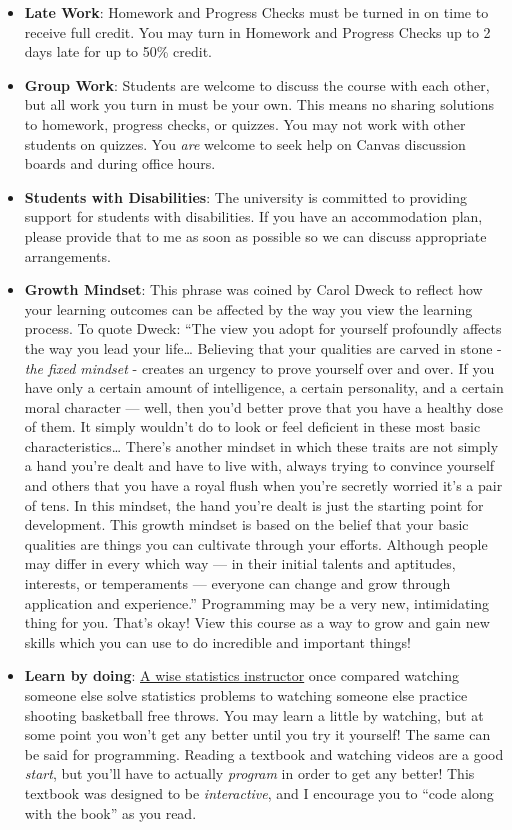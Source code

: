 \documentclass[
]{article}
\providecommand{\tightlist}{%
  \setlength{\itemsep}{0pt}\setlength{\parskip}{0pt}}
\begin{document}
\begin{itemize}
\tightlist
\item
  \textbf{Late Work}: Homework and Progress Checks must be turned in on time to receive full credit. You may turn in Homework and Progress Checks up to 2 days late for up to 50\% credit.
\item
  \textbf{Group Work}: Students are welcome to discuss the course with each other, but all work you turn in must be your own. This means no sharing solutions to homework, progress checks, or quizzes. You may not work with other students on quizzes. You \emph{are} welcome to seek help on Canvas discussion boards and during office hours.
\item
  \textbf{Students with Disabilities}: The university is committed to providing support for students with disabilities. If you have an accommodation plan, please provide that to me as soon as possible so we can discuss appropriate arrangements.
\item
  \textbf{Growth Mindset}: This phrase was coined by Carol Dweck to reflect how your learning outcomes can be affected by the way you view the learning process. To quote Dweck: ``The view you adopt for yourself profoundly affects the way you lead your life\ldots{} Believing that your qualities are carved in stone - \emph{the fixed mindset} - creates an urgency to prove yourself over and over. If you have only a certain amount of intelligence, a certain personality, and a certain moral character --- well, then you'd better prove that you have a healthy dose of them. It simply wouldn't do to look or feel deficient in these most basic characteristics\ldots{} There's another mindset in which these traits are not simply a hand you're dealt and have to live with, always trying to convince yourself and others that you have a royal flush when you're secretly worried it's a pair of tens. In this mindset, the hand you're dealt is just the starting point for development. This growth mindset is based on the belief that your basic qualities are things you can cultivate through your efforts. Although people may differ in every which way --- in their initial talents and aptitudes, interests, or temperaments --- everyone can change and grow through application and experience.'' Programming may be a very new, intimidating thing for you. That's okay! View this course as a way to grow and gain new skills which you can use to do incredible and important things!
\item
  \textbf{Learn by doing}: \href{https://statistics.colostate.edu/person/?id=B0D2F899C79C05AAE4EDBA6EE2FECACA\&sq=t}{A wise statistics instructor} once compared watching someone else solve statistics problems to watching someone else practice shooting basketball free throws. You may learn a little by watching, but at some point you won't get any better until you try it yourself! The same can be said for programming. Reading a textbook and watching videos are a good \emph{start}, but you'll have to actually \emph{program} in order to get any better! This textbook was designed to be \emph{interactive}, and I encourage you to ``code along with the book'' as you read.
\end{itemize}
\end{document}
